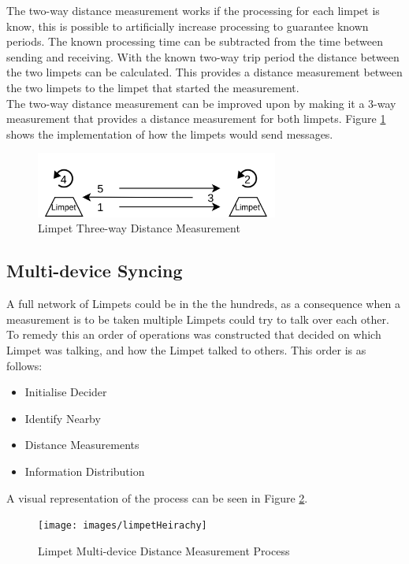The two-way distance measurement works if the processing for each limpet is know, this is possible to artificially increase processing to guarantee known periods. The known processing time can be subtracted from the time between sending and receiving. With the known two-way trip period the distance between the two limpets can be calculated. This provides a distance measurement between the two limpets to the limpet that started the measurement.\\

The two-way distance measurement can be improved upon by making it a 3-way measurement that provides a distance measurement for both limpets. Figure \ref{fig:limpetThreeway} shows the implementation of how the limpets would send messages.

\begin{figure}[H]
	\centering
	\noindent\includegraphics[width=0.71\textwidth]{images/limpetThreeway}
	\caption{Limpet Three-way Distance Measurement}
	\label{fig:limpetThreeway}
\end{figure}

\subsection{Multi-device Syncing}
A full network of Limpets could be in the the hundreds, as a consequence when a measurement is to be taken multiple Limpets could try to talk over each other. To remedy this an order of operations was constructed that decided on which Limpet was talking, and how the Limpet talked to others. This order is as follows:

\begin{itemize}
\item Initialise Decider
\item Identify Nearby
\item Distance Measurements
\item Information Distribution
\end{itemize}

A visual representation of the process can be seen in Figure \ref{fig:limpetHeirachy}.

\begin{figure}[H]
	\centering
	\noindent\texttt{[image: images/limpetHeirachy]}
	\caption{Limpet Multi-device Distance Measurement Process}
	\label{fig:limpetHeirachy}
\end{figure}

